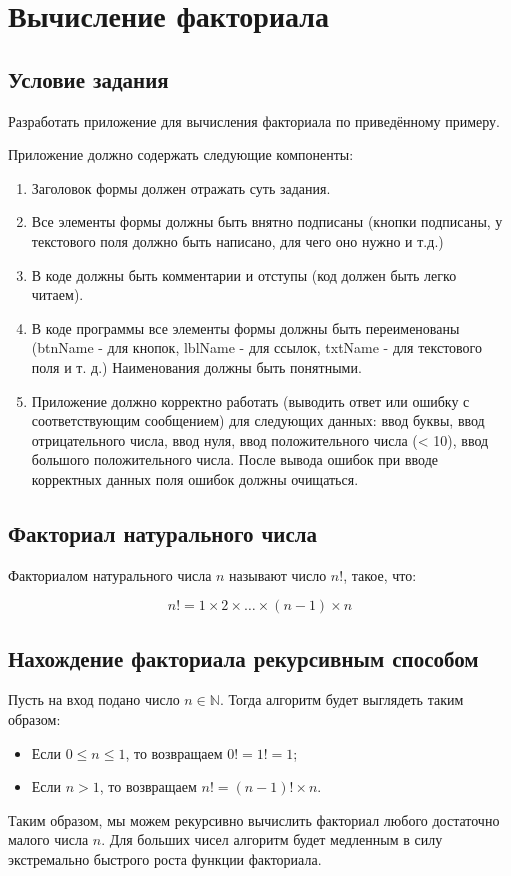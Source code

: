 \section{Вычисление факториала}
\subsection{Условие задания}
Разработать приложение для вычисления факториала по приведённому примеру.

Приложение должно содержать следующие компоненты:

\begin{enumerate}
  \item Заголовок формы должен отражать суть задания.
  \item Все элементы формы должны быть внятно подписаны (кнопки подписаны, у текстового поля должно быть написано, для чего оно нужно и т.д.)
  \item В коде должны быть комментарии и отступы (код должен быть легко читаем).
  \item В коде программы все элементы формы должны быть переименованы (btnName -  для кнопок, lblName - для ссылок, txtName - для текстового поля и т. д.) Наименования должны быть понятными.
  \item Приложение должно корректно работать (выводить ответ или ошибку с соответствующим сообщением) для следующих данных: ввод буквы, ввод отрицательного числа, ввод нуля, ввод положительного числа (< 10), ввод большого положительного числа. После вывода ошибок при вводе корректных данных поля ошибок должны очищаться.
\end{enumerate}

\subsection{Факториал натурального числа}
Факториалом натурального числа $n$ называют число $n!$, такое, что:

\begin{equation}
  n! = 1 \times 2 \times \dots \times (n - 1) \times n
\end{equation}

\subsection{Нахождение факториала рекурсивным способом}
Пусть на вход подано число $n\in\mathbb{N}$. Тогда алгоритм \cite{factorial-calculation} будет выглядеть таким образом:
\begin{itemize}
  \item Если $0 \leqslant n \leqslant 1$, то возвращаем $0! = 1! = 1$;
  \item Если $n > 1$, то возвращаем $n! = (n-1)!\times n$.
\end{itemize}
Таким образом, мы можем рекурсивно вычислить факториал любого достаточно малого числа $n$. Для больших чисел алгоритм будет медленным в силу экстремально быстрого роста функции факториала.

